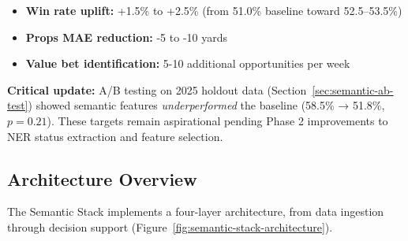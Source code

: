 \begin{itemize}[itemsep=2pt,parsep=0pt]
    \item \textbf{Win rate uplift:} +1.5\% to +2.5\% (from 51.0\% baseline toward 52.5--53.5\%)
    \item \textbf{Props MAE reduction:} -5 to -10 yards
    \item \textbf{Value bet identification:} 5-10 additional opportunities per week
\end{itemize}

\textbf{Critical update:} A/B testing on 2025 holdout data (Section~\ref{sec:semantic-ab-test}) showed semantic features \emph{underperformed} the baseline (58.5\% → 51.8\%, $p=0.21$). These targets remain aspirational pending Phase 2 improvements to NER status extraction and feature selection.

\subsection{Architecture Overview}

The Semantic Stack implements a four-layer architecture, from data ingestion through decision support (Figure~\ref{fig:semantic-stack-architecture}).

